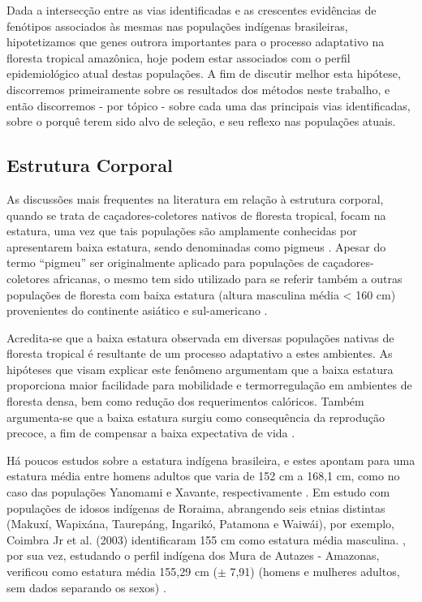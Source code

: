Dada a intersecção entre as vias identificadas e as crescentes evidências de fenótipos associados às mesmas nas populações indígenas brasileiras, hipotetizamos que genes outrora importantes para o processo adaptativo na floresta tropical amazônica, hoje podem estar associados com o perfil epidemiológico atual destas populações. A fim de discutir melhor esta hipótese, discorremos primeiramente sobre os resultados dos métodos neste trabalho, e então discorremos - por tópico - sobre cada uma das principais  vias identificadas, sobre o porquê terem sido alvo de seleção, e seu reflexo nas populações atuais.

\subsection{Estrutura Corporal}

As discussões mais frequentes na literatura em relação à estrutura corporal, quando se trata de caçadores-coletores nativos de floresta tropical, focam na estatura, uma vez que tais populações são amplamente conhecidas por apresentarem baixa estatura, sendo denominadas como pigmeus \cite{verdu_african_2016}. Apesar do termo “pigmeu” ser originalmente aplicado para populações de caçadores-coletores africanas, o mesmo tem sido utilizado para se referir também a outras populações de floresta com baixa estatura (altura masculina média < 160 cm) provenientes do continente asiático e sul-americano \cite{perry_evolution_2009}.

Acredita-se que a baixa estatura observada em diversas populações nativas de floresta tropical é resultante de um processo adaptativo a estes ambientes. As hipóteses que visam explicar este fenômeno argumentam que a baixa estatura proporciona maior facilidade para mobilidade e termorregulação em ambientes de floresta densa, bem como redução dos requerimentos calóricos. Também argumenta-se que a baixa estatura surgiu como consequência da reprodução precoce, a fim de compensar a baixa expectativa de vida \cite{migliano_life_2007,perry_evolution_2009,verdu_african_2016}.

Há poucos estudos sobre a estatura indígena brasileira, e estes apontam para uma estatura média entre homens adultos que varia de 152 cm a 168,1 cm, como no caso das populações Yanomami e Xavante, respectivamente \cite{coimbra_jr_perfil_2001,perry_evolution_2009}. Em estudo com populações de idosos indígenas de Roraima, abrangendo seis etnias distintas (Makuxí, Wapixána, Taurepáng, Ingarikó, Patamona e Waiwái), por exemplo, Coimbra Jr et al. (2003) identificaram 155 cm como estatura média masculina. , por sua vez, estudando o perfil indígena dos Mura de Autazes - Amazonas, verificou como estatura média 155,29 cm ($\pm$ 7,91) (homens e mulheres adultos, sem dados separando os sexos) \cite{ferreira_influencia_2016}.

